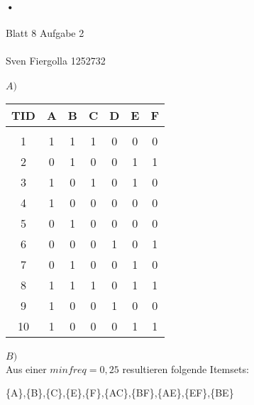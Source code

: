 \documentclass[10pt, a4paper]{article}
\begin{document}
\paragraph{•}
\begin{huge}
Blatt 8 Aufgabe 2
\end{huge}\par
\paragraph{}
\begin{small}
Sven Fiergolla 1252732
\end{small}\par

\paragraph{}
$A)$\\
\begin{center}
\begin{tabular}{c||c|c|c|c|c|c}
\textbf{TID} & \textbf{A} & \textbf{B} & \textbf{C} & \textbf{D} & \textbf{E} & \textbf{F} \\
\hline \\
1 & 1 & 1 & 1 & 0 & 0 & 0 \\ \hline 
2 & 0 & 1 & 0 & 0 & 1 & 1 \\ \hline 
3 & 1 & 0 & 1 & 0 & 1 & 0 \\ \hline 
4 & 1 & 0 & 0 & 0 & 0 & 0 \\ \hline
5 & 0 & 1 & 0 & 0 & 0 & 0 \\ \hline
6 & 0 & 0 & 0 & 1 & 0 & 1 \\ \hline
7 & 0 & 1 & 0 & 0 & 1 & 0 \\ \hline
8 & 1 & 1 & 1 & 0 & 1 & 1 \\ \hline
9 & 1 & 0 & 0 & 1 & 0 & 0 \\ \hline
10 & 1 & 0 & 0 & 0 & 1 & 1 \\
\end{tabular}
\end{center}\par

\paragraph{}
$B)$\\

Aus einer $minfreq = 0,25$ resultieren folgende Itemsets:\\
\bigskip
\begin{center}
\{A\},\{B\},\{C\},\{E\},\{F\},\{AC\},\{BF\},\{AE\},\{EF\},\{BE\}
\end{center}
\par
\end{document}
